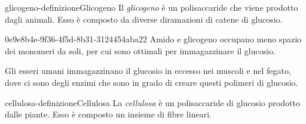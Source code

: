 \documentclass[preview]{standalone}
\begin{document}
\begin{snippetdefinition}{glicogeno-definizione}{Glicogeno}
    Il \textit{glicogeno} è un polisaccaride che viene prodotto dagli animali.
    Esso è composto da diverse diramazioni di catene di glucosio.
\end{snippetdefinition}

\begin{snippet}{0e9e8b4e-9f36-4f5d-8b31-3124454aba22}
    Amido e glicogeno occupano meno spazio dei monomeri da soli, per cui sono ottimali per immagazzinare
il glucosio.

Gli esseri umani immagazzinano il glucosio in eccesso nei muscoli e nel fegato, dove ci sono degli enzimi
che sono in grado di creare questi polimeri di glucosio.
\end{snippet}

\begin{snippetdefinition}{cellulosa-definizione}{Cellulosa}
    La \textit{cellulosa} è un polisaccaride di glucosio prodotto dalle piante.
    Esso è composto un insieme di fibre lineari.
\end{snippetdefinition}



\end{document}
